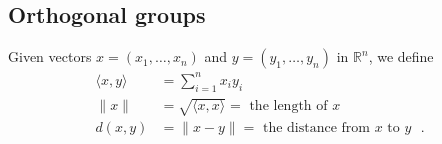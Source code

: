 \documentclass{amsart}
\newcommand{\R}         {{\mathbb{R}}}
\newcommand{\blm}       {\left(\begin{array}{cc}}
\newcommand{\elm}       {\end{array}\right)}
\newcommand{\ip}[1]     {\langle #1\rangle}
\newcommand{\tm}        {\times}
\renewcommand{\:}{\colon}
\theoremstyle{definition}
\begin{document}



\subsection{Orthogonal groups}

Given vectors $x=(x_1,\ldots,x_n)$ and $y=(y_1,\ldots,y_n)$ in $\R^n$,
we define
\begin{align*}
 \ip{x,y} &= \sum_{i=1}^n x_i y_i \\
 \|x\|    &= \sqrt{\ip{x,x}} = \text{ the length of } x \\
 d(x,y)   &= \|x-y\| = \text{ the distance from $x$ to $y$ }.
\end{align*}
\end{document}
